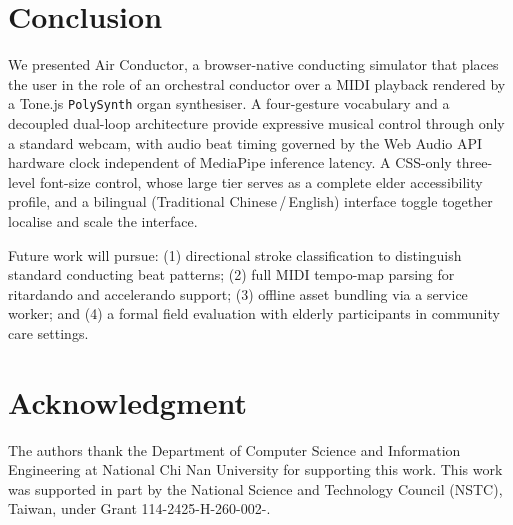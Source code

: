 \documentclass[conference]{IEEEtran}
\begin{document}
\section{Conclusion}
\label{sec:conclusion}

We presented Air Conductor, a browser-native conducting simulator that
places the user in the role of an orchestral conductor over a MIDI
playback rendered by a Tone.js \texttt{PolySynth} organ synthesiser. A
four-gesture vocabulary and a decoupled dual-loop architecture provide
expressive musical control through only a standard webcam, with audio
beat timing governed by the Web Audio API hardware clock independent of
MediaPipe inference latency. A CSS-only three-level font-size control,
whose large tier serves as a complete elder accessibility profile,
and a bilingual (Traditional Chinese\,/\,English) interface toggle
together localise and scale the interface.

Future work will pursue: (1) directional stroke classification to
distinguish standard conducting beat patterns; (2) full MIDI tempo-map
parsing for ritardando and accelerando support; (3) offline asset
bundling via a service worker; and (4) a formal field evaluation with
elderly participants in community care settings.

\section*{Acknowledgment}
The authors thank the Department of Computer Science and Information
Engineering at National Chi Nan University for supporting this work.
This work was supported in part by the National Science and Technology
Council (NSTC), Taiwan, under Grant 114-2425-H-260-002-.
\end{document}
